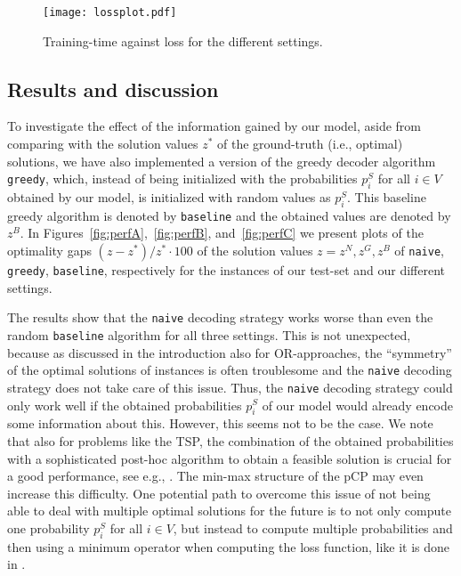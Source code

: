 \documentclass[]{article}
\newcommand{\PCP}{pCP\xspace}
\begin{document}
\begin{figure}[h!]
	\centering
\texttt{[image: lossplot.pdf]}
\caption{Training-time against loss for the different settings.\label{fig:loss}}
\end{figure}

\subsection{Results and discussion}

To investigate the effect of the information gained by our model, aside from 
comparing with the solution values $z^*$ of the ground-truth (i.e., optimal) 
solutions, we have also implemented a version of the greedy decoder algorithm 
\texttt{greedy}, which, instead of being initialized with the probabilities 
$p^S_i$ for all $i \in V$ obtained by our model, is initialized with random 
values as $p_i^S$. This baseline greedy algorithm is denoted by 
\texttt{baseline} 
and the obtained values are denoted by $z^B$. In 
Figures~\ref{fig:perfA},~\ref{fig:perfB}, and~\ref{fig:perfC} we present plots 
of the optimality gaps $(z-z^*)/z^*\cdot 100$ of the solution values $z=z^N, 
z^G, z^B$ of \texttt{naive}, \texttt{greedy}, \texttt{baseline}, respectively 
for the instances of our test-set and our different settings.

The results show that the \texttt{naive} decoding strategy works worse than 
even the random \texttt{baseline} algorithm for all three settings. This is not 
unexpected, because as 
discussed in the introduction also for OR-approaches, the ``symmetry'' of the 
optimal solutions of instances is often troublesome  and the \texttt{naive} 
decoding strategy does not take care of this issue. Thus, the \texttt{naive} 
decoding strategy could only work well if the obtained probabilities $p^S_i$ of 
our model would already encode some information about this. However, this seems 
not to be the case. We note that also for problems like the TSP, the 
combination of the obtained probabilities with a sophisticated post-hoc 
algorithm to obtain a feasible solution is crucial for a good performance, see 
e.g., \cite{joshi2019efficient,joshi2020learning}. The min-max structure of the 
\PCP may even increase this difficulty.
One potential path to overcome this issue of not being able to deal with 
multiple optimal solutions for the future is to not only compute one 
probability $p^S_i$ for all $i \in V$, but instead to compute multiple 
probabilities and then using a minimum operator when computing the loss 
function, like it is done in \cite{li2018combinatorial}.
\end{document}
